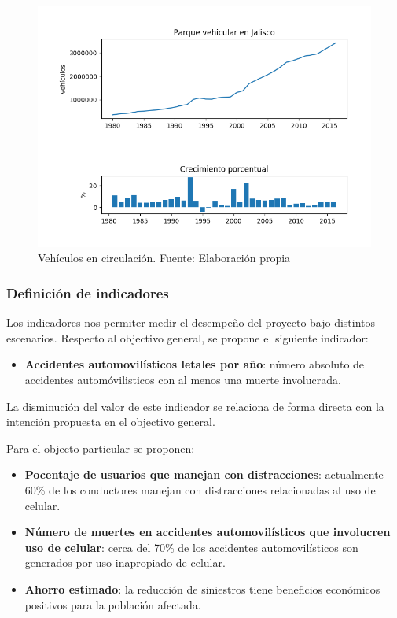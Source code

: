 \documentclass{article}
\begin{document}
	\begin{figure}[H]\centering
	\includegraphics[width=1\textwidth]{resources/img/parque_vehicular.png}
	\caption{\label{fig:parque_vehicular} Vehículos en circulación. Fuente: Elaboración propia}
    \end{figure}

\subsubsection{Definición de indicadores}

Los indicadores nos permiter medir el desempeño del proyecto bajo distintos escenarios.
Respecto al objectivo general, se propone el siguiente indicador:

\begin{itemize}
	\item \textbf{Accidentes automovilísticos letales por año}: número absoluto de accidentes automóvilisticos
con al menos una muerte involucrada.
\end{itemize}

La disminución del valor de este indicador se relaciona de forma directa con la intención propuesta en el objectivo general.

Para el objecto particular se proponen:

\begin{itemize}
	\item \textbf{Pocentaje de usuarios que manejan con distracciones}: actualmente 60\% de los conductores manejan con
distracciones relacionadas al uso de celular.
	\item \textbf{Número de muertes en accidentes automovilísticos que involucren uso de celular}: cerca del 70\% de los
accidentes automovilísticos son generados por uso inapropiado de celular.
	\item \textbf{Ahorro estimado}: la reducción de siniestros tiene beneficios económicos positivos para la población
afectada.
\end{itemize}
\end{document}
